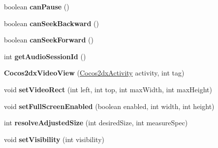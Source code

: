 \begin{DoxyCompactItemize}
boolean {\bfseries can\+Pause} ()
\item 
\mbox{\label{classorg_1_1cocos2dx_1_1lib_1_1Cocos2dxVideoView_afdb218a12b7f5115d46dba5870f12fa9}} 
boolean {\bfseries can\+Seek\+Backward} ()
\item 
\mbox{\label{classorg_1_1cocos2dx_1_1lib_1_1Cocos2dxVideoView_a11c0408b0871d6ba2a95afb3991d6c30}} 
boolean {\bfseries can\+Seek\+Forward} ()
\item 
\mbox{\label{classorg_1_1cocos2dx_1_1lib_1_1Cocos2dxVideoView_a3fdf62fe54b0502aaea0a7378abca41e}} 
int {\bfseries get\+Audio\+Session\+Id} ()
\item 
\mbox{\label{classorg_1_1cocos2dx_1_1lib_1_1Cocos2dxVideoView_a0f74d463d6f8c72bbb36f79bfcb36347}} 
{\bfseries Cocos2dx\+Video\+View} (\hyperlink{classorg_1_1cocos2dx_1_1lib_1_1Cocos2dxActivity}{Cocos2dx\+Activity} activity, int tag)
\item 
\mbox{\label{classorg_1_1cocos2dx_1_1lib_1_1Cocos2dxVideoView_a87075c6cb8b1488e11056bb949f0c66a}} 
void {\bfseries set\+Video\+Rect} (int left, int top, int max\+Width, int max\+Height)
\item 
\mbox{\label{classorg_1_1cocos2dx_1_1lib_1_1Cocos2dxVideoView_aa7d2189136ed6c6b443bb9191f379db1}} 
void {\bfseries set\+Full\+Screen\+Enabled} (boolean enabled, int width, int height)
\item 
\mbox{\label{classorg_1_1cocos2dx_1_1lib_1_1Cocos2dxVideoView_a9f562f848f19b8fe4c82c1559aa4f91e}} 
int {\bfseries resolve\+Adjusted\+Size} (int desired\+Size, int measure\+Spec)
\item 
\mbox{\label{classorg_1_1cocos2dx_1_1lib_1_1Cocos2dxVideoView_a22d52a259751a4d1be97c1d214915dd7}} 
void {\bfseries set\+Visibility} (int visibility)
\item 
\mbox{\label{classorg_1_1cocos2dx_1_1lib_1_1Cocos2dxVideoView_a2cb7379fc070381be2376eafb89290f1}} 

\end{DoxyCompactItemize}
